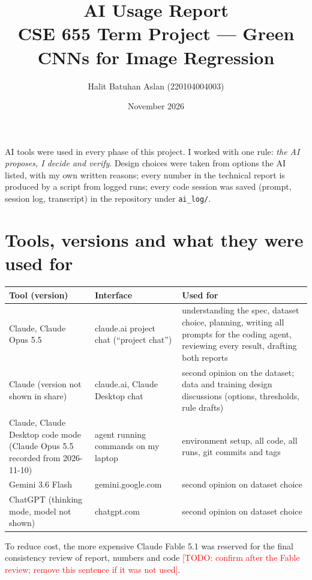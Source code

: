 \documentclass[11pt,a4paper]{article}
\title{\textbf{AI Usage Report}\\[2pt]\large CSE 655 Term Project --- Green CNNs for Image Regression}
\author{Halit Batuhan Aslan \quad (220104004003)}
\date{November 2026}
\newcommand{\todo}[1]{\textcolor{red}{[TODO: #1]}}
\begin{document}
\maketitle

\noindent AI tools were used in every phase of this project. I worked with one rule: \emph{the AI proposes,
I decide and verify}. Design choices were taken from options the AI listed, with my own written reasons;
every number in the technical report is produced by a script from logged runs; every code session was
saved (prompt, session log, transcript) in the repository under \texttt{ai\_log/}.

\section{Tools, versions and what they were used for}
\begin{center}\small
\begin{tabularx}{\linewidth}{@{}p{3.6cm}p{3.6cm}Y@{}}
\toprule
Tool (version) & Interface & Used for\\
\midrule
Claude, Claude Opus 5.5 & claude.ai project chat (``project chat'') & understanding the spec, dataset choice,
planning, writing all prompts for the coding agent, reviewing every result, drafting both reports\\
Claude (version not shown in share) & claude.ai, Claude Desktop chat & second opinion on the dataset; data and
training design discussions (options, thresholds, rule drafts)\\
Claude, Claude Desktop code mode (Claude Opus 5.5 recorded from 2026-11-10) & agent running commands on my laptop &
environment setup, all code, all runs, git commits and tags\\
Gemini 3.6 Flash & gemini.google.com & second opinion on dataset choice\\
ChatGPT (thinking mode, model not shown) & chatgpt.com & second opinion on dataset choice\\
\bottomrule
\end{tabularx}
\end{center}
To reduce cost, the more expensive Claude Fable 5.1 was reserved for the final consistency review of report,
numbers and code \todo{confirm after the Fable review; remove this sentence if it was not used}.

\end{document}
